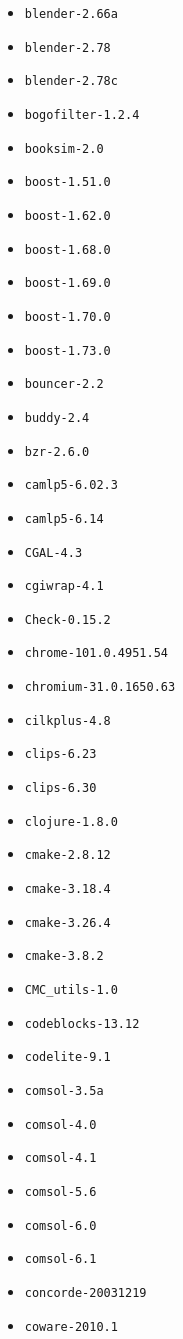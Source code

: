 \begin{itemize}
\item \verb|blender-2.66a|
\item \verb|blender-2.78|
\item \verb|blender-2.78c|
\item \verb|bogofilter-1.2.4|
\item \verb|booksim-2.0|
\item \verb|boost-1.51.0|
\item \verb|boost-1.62.0|
\item \verb|boost-1.68.0|
\item \verb|boost-1.69.0|
\item \verb|boost-1.70.0|
\item \verb|boost-1.73.0|
\item \verb|bouncer-2.2|
\item \verb|buddy-2.4|
\item \verb|bzr-2.6.0|
\item \verb|camlp5-6.02.3|
\item \verb|camlp5-6.14|
\item \verb|CGAL-4.3|
\item \verb|cgiwrap-4.1|
\item \verb|Check-0.15.2|
\item \verb|chrome-101.0.4951.54|
\item \verb|chromium-31.0.1650.63|
\item \verb|cilkplus-4.8|
\item \verb|clips-6.23|
\item \verb|clips-6.30|
\item \verb|clojure-1.8.0|
\item \verb|cmake-2.8.12|
\item \verb|cmake-3.18.4|
\item \verb|cmake-3.26.4|
\item \verb|cmake-3.8.2|
\item \verb|CMC_utils-1.0|
\item \verb|codeblocks-13.12|
\item \verb|codelite-9.1|
\item \verb|comsol-3.5a|
\item \verb|comsol-4.0|
\item \verb|comsol-4.1|
\item \verb|comsol-5.6|
\item \verb|comsol-6.0|
\item \verb|comsol-6.1|
\item \verb|concorde-20031219|
\item \verb|coware-2010.1|

\end{itemize}
